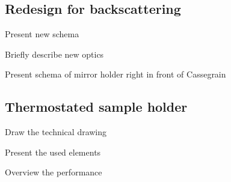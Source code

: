 \subsection{Redesign for backscattering}
\begin{docitemize}
	\item Present new schema
	\item Briefly describe new optics
	\item Present schema of mirror holder right in front of Cassegrain
\end{docitemize}


\subsection{Thermostated sample holder}
\begin{docitemize}
	\item Draw the technical drawing
	\item Present the used elements
	\item Overview the performance
\end{docitemize}
